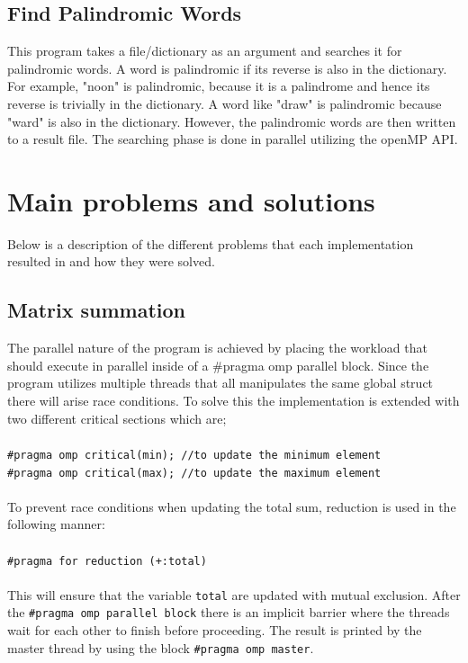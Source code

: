 \documentclass{article}
\begin{document}
\subsection{Find Palindromic Words}

This program takes a file/dictionary as an argument and searches it for palindromic words. A word is palindromic if its reverse is also in the dictionary. For example, "noon" is palindromic, because it is a palindrome and hence its reverse is trivially in the dictionary. A word like "draw" is palindromic because "ward" is also in the dictionary. However,  the palindromic words are then written to a result file. The searching phase is done in parallel utilizing the openMP API.  

\section{Main problems and solutions}

Below is a description of the different problems that each implementation resulted in and how they were solved. 

\subsection{Matrix summation}

The parallel nature of the program is achieved by placing the workload that should execute in parallel inside of a #pragma omp parallel block. Since the program utilizes multiple threads that all manipulates the same global struct there will arise race conditions. To solve this the implementation is extended with two different critical sections which are; \\\\
\texttt{#pragma omp critical(min);      //to update the minimum element}\\
\texttt{#pragma omp critical(max);      //to update the maximum element}
\\\\To prevent race conditions when updating the total sum, reduction is used in the following manner: 
\\\\\texttt{#pragma for reduction (+:total)}
\\\\This will ensure that the variable \texttt{total} are updated with mutual exclusion. After the \texttt{#pragma omp parallel block} there is an implicit barrier where the threads wait for each other to finish before proceeding. The result is printed by the master thread by using the block \texttt{#pragma omp master}.  
\end{document}
